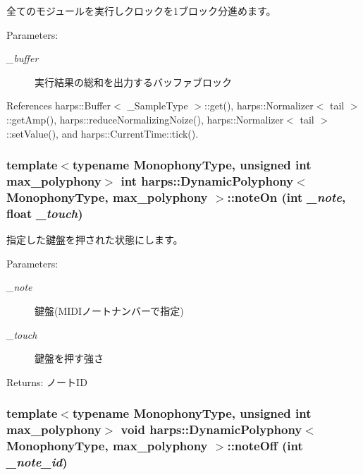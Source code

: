 全てのモジュールを実行しクロックを1ブロック分進めます。 \begin{Desc}
\item[Parameters:]
\begin{description}
\item[{\em \_\-buffer}]実行結果の総和を出力するバッファブロック \end{description}
\end{Desc}


References harps::Buffer$<$ \_\-SampleType $>$::get(), harps::Normalizer$<$ tail $>$::getAmp(), harps::reduceNormalizingNoize(), harps::Normalizer$<$ tail $>$::setValue(), and harps::CurrentTime::tick().
\subsubsection[noteOn]{\setlength{\rightskip}{0pt plus 5cm}template$<$typename MonophonyType, unsigned int max\_\-polyphony$>$ int {\bf harps::DynamicPolyphony}$<$ MonophonyType, max\_\-polyphony $>$::noteOn (int {\em \_\-note}, \/  float {\em \_\-touch})\hspace{0.3cm}{\tt  [inline]}}\label{classharps_1_1DynamicPolyphony_664216adf59bb943e5e399c43309888c}


指定した鍵盤を押された状態にします。 \begin{Desc}
\item[Parameters:]
\begin{description}
\item[{\em \_\-note}]鍵盤(MIDIノートナンバーで指定) \item[{\em \_\-touch}]鍵盤を押す強さ \end{description}
\end{Desc}
\begin{Desc}
\item[Returns:]ノートID \end{Desc}
\subsubsection[noteOff]{\setlength{\rightskip}{0pt plus 5cm}template$<$typename MonophonyType, unsigned int max\_\-polyphony$>$ void {\bf harps::DynamicPolyphony}$<$ MonophonyType, max\_\-polyphony $>$::noteOff (int {\em \_\-note\_\-id})\hspace{0.3cm}{\tt  [inline]}}\label{classharps_1_1DynamicPolyphony_7accc347e968a411ecaf81b377a5e50f}


